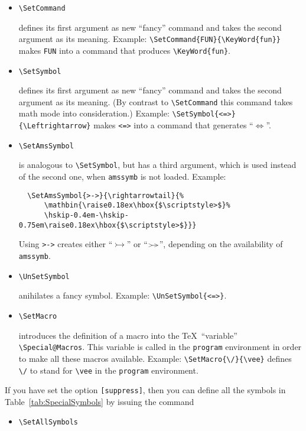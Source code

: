 \begin{itemize}
  \item \verb=\SetCommand=
    
    defines its first argument as new ``fancy'' command and takes the second
    argument as its meaning. Example:
    \verb+\SetCommand{FUN}{\KeyWord{fun}}+ makes \texttt{FUN} into a
    command that produces \verb=\KeyWord{fun}=.
  
  \item \verb=\SetSymbol= 
    
    defines its first argument as new ``fancy'' command and takes the
    second argument as its meaning. (By contrast to \verb=\SetCommand= this
    command takes math mode into consideration.) Example:
    \verb+\SetSymbol{<=>}{\Leftrightarrow}+ makes \texttt{<=>} into a
    command that generates ``$\Leftrightarrow$''.
  
  \item \verb=\SetAmsSymbol=
    
    is analogous to \verb=\SetSymbol=, but has a third argument, which is
    used instead of the second one, when \verb=amssymb= is not loaded.
    Example:
\begin{verbatim}
  \SetAmsSymbol{>->}{\rightarrowtail}{%
      \mathbin{\raise0.18ex\hbox{$\scriptstyle>$}%
      \hskip-0.4em-\hskip-0.75em\raise0.18ex\hbox{$\scriptstyle>$}}}
\end{verbatim}
    Using \verb=>->= creates either ``$\rightarrowtail$'' or
``${\raise0.18ex\hbox{$\scriptstyle>$}%
  \hskip-0.4em-\hskip-0.75em\raise0.18ex\hbox{$\scriptstyle>$}}$'',
depending on the availability of \texttt{amssymb}.
    
  \item \verb=\UnSetSymbol=

    anihilates a fancy symbol. Example:
    \verb+\UnSetSymbol{<=>}+.

  \item \verb=\SetMacro=
    
    introduces the definition of a macro into the \TeX~``variable''
    \verb+\Special@Macros+. This variable is called in the \texttt{program}
    environment in order to make all these macros available. Example:
    \verb+\SetMacro{\/}{\vee}+ defines \verb+\/+ to stand for \verb+\vee+
    in the \texttt{program} environment.

\end{itemize}

If you have set the option \texttt{[suppress]}, then you can define all the
symbols in Table~\ref{tab:SpecialSymbols} by issuing the command
\begin{itemize}
  \item \verb=\SetAllSymbols=
\end{itemize}







